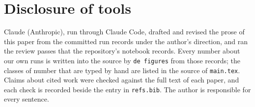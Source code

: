 \documentclass[11pt]{article}
\begin{document}








\section*{Disclosure of tools}

Claude (Anthropic), run through Claude Code, drafted and revised the prose of
this paper from the committed run records under the author's direction, and
ran the review passes that the repository's notebook records. Every number
about our own runs is written into the source by \texttt{de figures} from
those records; the classes of number that are typed by hand are listed in the
source of \texttt{main.tex}. Claims about cited work were checked against the
full text of each paper, and each check is recorded beside the entry in
\texttt{refs.bib}. The author is responsible for every sentence.




\appendix



\end{document}
